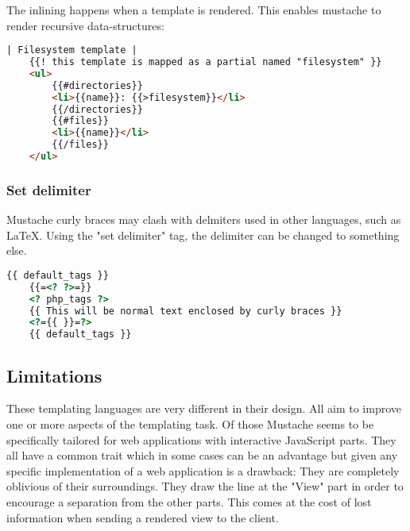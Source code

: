 The inlining happens when a template is rendered. This enables mustache to
render recursive data-structures:
\begin{lstlisting}[language=HTML]
	| Filesystem template |
	{{! this template is mapped as a partial named "filesystem" }}
	<ul>
		{{#directories}}
		<li>{{name}}: {{>filesystem}}</li>
		{{/directories}}
		{{#files}}
		<li>{{name}}</li>
		{{/files}}
	</ul>
\end{lstlisting}

\subsubsection{Set delimiter}
Mustache curly braces may clash with delmiters used in other languages,
such as LaTeX. Using the "set delimiter" tag, the delimiter can be changed to
something else.
\begin{lstlisting}[language=HTML]
	{{ default_tags }}
	{{=<? ?>=}}
	<? php_tags ?>
	{{ This will be normal text enclosed by curly braces }}
	<?={{ }}=?>
	{{ default_tags }}
\end{lstlisting}

\subsection{Limitations}
These templating languages are very different in their design.
All aim to improve one or more aspects of the templating task.
Of those Mustache seems to be specifically tailored for web applications
with interactive JavaScript parts.
They all have a common trait which in some cases can be an advantage
but given any specific implementation of a web application is a drawback:
They are completely oblivious of their surroundings. They draw the line
at the "View" part in order to encourage a separation from the other
parts. This comes at the cost of lost information when sending a
rendered view to the client.
